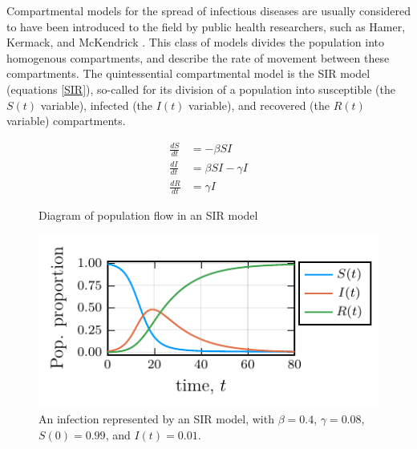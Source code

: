 Compartmental models for the spread of infectious diseases are usually considered to have been introduced to the field by public health researchers, such as Hamer, Kermack, and McKendrick \cite{hamer1906epidemic, kermack1927contribution, brauer2019mathematical,edelstein2005mathematical}. This class of models divides the population into homogenous compartments, and describe the rate of movement between these compartments. The quintessential compartmental model is the SIR model (equations \ref{SIR}), so-called for its division of a population into susceptible (the $S(t)$ variable), infected (the $I(t)$ variable), and recovered (the $R(t)$ variable) compartments. 

\begin{align}
    \frac{dS}{dt} &= -\beta S I  \\
    \frac{dI}{dt} &= \beta S I - \gamma I\\
    \frac{dR}{dt} &= \gamma I \label{SIR} 
\end{align}

\begin{figure}
    \begin{minipage}[c]{0.4\textwidth}
    \centering
        \caption{Diagram of population flow in an SIR model}
        \label{SIR_diagram}
    \end{minipage}\hfill
    \begin{minipage}[c]{0.55\textwidth}
        \centering
        \includegraphics{chapter_0/sir.pdf}
        \caption{An infection represented by an SIR model, with $\beta = 0.4$, $\gamma = 0.08$, $S(0) = 0.99$, and $I(t) = 0.01$.}
        \label{SIR_plots}
    \end{minipage}
\end{figure}


